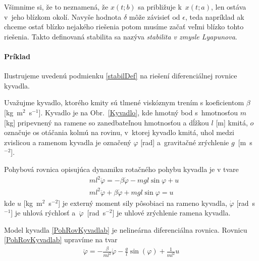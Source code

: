 \documentclass[a4paper, 10pt, ]{article}
\begin{document}
Všimnime si, že to neznamená, že $x(t;b)$ sa približuje k~$x(t;a)$, len ostáva v~jeho blízkom okolí. Navyše hodnota $\delta$ môže závisieť od $\epsilon$, teda napríklad ak chceme ostať blízko nejakého riešenia potom musíme začať veľmi blízko tohto riešenia. Takto definovaná stabilita sa nazýva \emph{stabilita v zmysle Lyapunova}.







\paragraph{Príklad}

Ilustrujeme uvedenú podmienku \eqref{stabilDef} na riešení diferenciálnej rovnice kyvadla.

\bigskip


Uvažujme kyvadlo, ktorého kmity sú tlmené viskóznym trením s koeficientom $\beta$ [kg~m$^2$~s$^{-1}$]. Kyvadlo je na Obr.~\ref{Kyvadlo}, kde hmotný bod s~hmotnosťou $m$ [kg] pripevnený na ramene so zanedbateľnou hmotnosťou a dĺžkou $l$ [m] kmitá, $o$ označuje os otáčania kolmú na rovinu, v~ktorej kyvadlo kmitá, uhol medzi zvislicou a ramenom kyvadla je označený $\varphi$ [rad] a~gravitačné zrýchlenie $g$~[m~s$^{-2}$].

Pohybová rovnica opisujúca dynamiku rotačného pohybu kyvadla je v tvare
\begin{subequations} \label{PohRovKyvadla}
\begin{align}
		&ml^2 \ddot{\varphi} = -\beta \dot{\varphi} - mgl\sin{\varphi} + u \\
		&ml^2 \ddot{\varphi} + \beta \dot{\varphi} + mgl\sin{\varphi} = u \label{PohRovKyvadlab}
\end{align}
\end{subequations}
kde $u$ [kg~m$^2$~s$^{-2}$] je externý moment sily pôsobiaci na rameno kyvadla, $\dot{\varphi}$ [rad~s$^{-1}$] je uhlová rýchlosť a~$\ddot{\varphi}$~[rad~s$^{-2}$] je uhlové zrýchlenie ramena kyvadla.

Model kyvadla \eqref{PohRovKyvadlab} je nelineárna diferenciálna rovnica.  Rovnicu \eqref{PohRovKyvadlab} upravíme na tvar
\begin{align}
	\ddot{\varphi} = - \frac{\beta}{ml^2} \dot{\varphi} - \frac{g}{l} \sin(\varphi) + \frac{1}{ml^2}u
\end{align}
\end{document}
